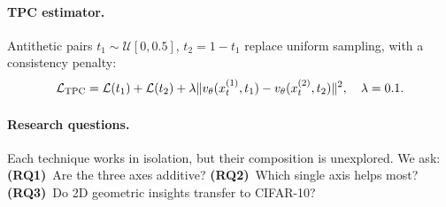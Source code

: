 \paragraph{TPC estimator.} Antithetic pairs $t_1 \sim \mathcal{U}[0,0.5]$, $t_2=1-t_1$ replace uniform sampling, with a consistency penalty:
\begin{equation}
    \mathcal{L}_{\text{TPC}} = \mathcal{L}(t_1) + \mathcal{L}(t_2) + \lambda\|v_\theta(x_t^{(1)},t_1) - v_\theta(x_t^{(2)},t_2)\|^2, \quad \lambda=0.1.
    \label{eq:tpc}
\end{equation}

\paragraph{Research questions.} Each technique works in isolation, but their composition is unexplored. We ask: \textbf{(RQ1)}~Are the three axes additive? \textbf{(RQ2)}~Which single axis helps most? \textbf{(RQ3)}~Do 2D geometric insights transfer to CIFAR-10?
